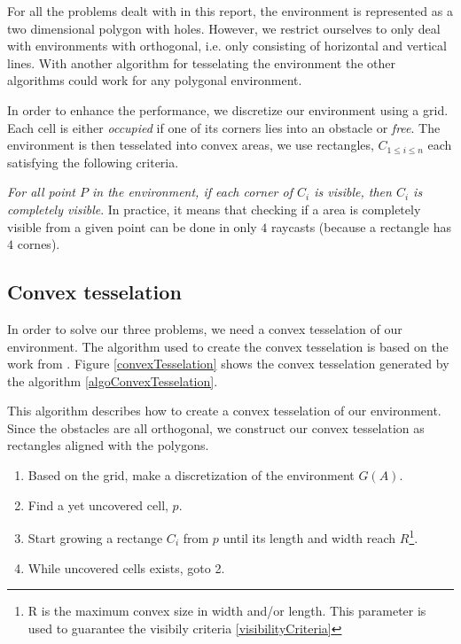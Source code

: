 For all the problems dealt with in this report, the environment is represented as a two dimensional polygon with holes. However, we restrict ourselves to only deal with environments with orthogonal, i.e. only consisting of horizontal and vertical lines. With another algorithm for tesselating the environment the other algorithms could work for any polygonal environment.

In order to enhance the performance, we discretize our environment using a grid. Each cell is either \emph{occupied} if one of its corners lies into an obstacle or \emph{free}.
The environment is then tesselated into convex areas, we use rectangles, $C_{1\leq i \leq n}$ each satisfying the following criteria.

\begin{criteria}[of Visibility]
 \emph{For all point $P$ in the environment, if each corner of $C_i$ is visible, then $C_i$ is completely visible}. In practice, it means that checking if a area is completely visible from a given point can be done in only $4$ raycasts (because a rectangle has $4$ cornes).
\label{visibilityCriteria}
\end{criteria}


\subsection{Convex tesselation}

In order to solve our three problems, we need a convex tesselation of our environment. The algorithm used to create the convex tesselation is based on the work from \cite{CoopMinTime}. Figure \ref{convexTesselation} shows the convex tesselation generated by the algorithm \ref{algoConvexTesselation}.

\begin{algorithm}
This algorithm describes how to create a convex tesselation of our environment. Since the obstacles are all orthogonal, we construct our convex tesselation as rectangles aligned with the polygons.
\begin{enumerate}
\item Based on the grid, make a discretization of the environment $G(A)$.
\item Find a yet uncovered cell, $p$.
\item Start growing a rectange $C_i$ from $p$ until its length and width reach $R$\footnote{R is the maximum convex size in width and/or length. This parameter is used to guarantee the visibily criteria \ref{visibilityCriteria}}.
\item While uncovered cells exists, goto 2.
\end{enumerate}
\label{algoConvexTesselation}
\end{algorithm}

